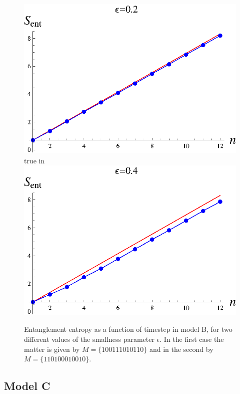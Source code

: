 \documentclass[11pt]{article}
\begin{document}
\begin{figure}[htbp]
\begin{center}
\includegraphics[scale=.58]{modelb2.eps} true in
\includegraphics[scale=.58]{modelb4.eps}
\caption{{Entanglement entropy as a function of timestep in model B, for  two different  values of the smallness parameter $\epsilon$. In the first case the matter is given by $M= \{100111010110\}$ and in the second by $M=\{ 110100010010\}$.}}
\label{fn5m}
\end{center}
\end{figure}


\subsection{Model C}
\end{document}
